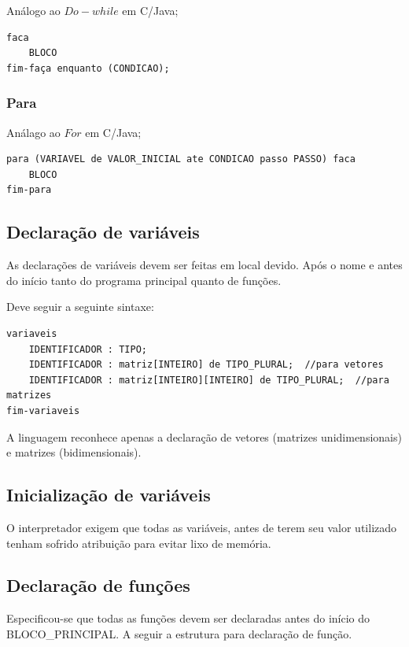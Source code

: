 \documentclass[a4paper,12pt]{report}
\begin{document}
An\'alogo ao $Do-while$ em C/Java;

\begin{verbatim}
faca
	BLOCO
fim-faça enquanto (CONDICAO);
\end{verbatim}

\subsubsection{Para}

An\'alago ao $For$ em C/Java;

\begin{verbatim}
para (VARIAVEL de VALOR_INICIAL ate CONDICAO passo PASSO) faca
	BLOCO
fim-para
\end{verbatim}

\subsection{Declara\c{c}\~ao de vari\'aveis}

As declara\c{c}\~oes de vari\'aveis devem ser feitas em local devido. Ap\'os o nome e antes do in\'icio tanto do programa principal quanto de fun\c{c}\~oes.

Deve seguir a seguinte sintaxe:

\begin{verbatim}
variaveis
	IDENTIFICADOR : TIPO;
	IDENTIFICADOR : matriz[INTEIRO] de TIPO_PLURAL;  //para vetores
    IDENTIFICADOR : matriz[INTEIRO][INTEIRO] de TIPO_PLURAL;  //para matrizes
fim-variaveis
\end{verbatim}

A linguagem reconhece apenas a declara\c{c}\~ao de vetores (matrizes unidimensionais) e matrizes (bidimensionais).

\subsection{Inicializa\c{c}\~ao de vari\'aveis}

O interpretador exigem que todas as vari\'aveis, antes de terem seu valor utilizado tenham 
sofrido atribui\c{c}\~ao para evitar lixo de mem\'oria.

\subsection{Declara\c{c}\~ao de fun\c{c}\~oes}

Especificou-se que todas as fun\c{c}\~oes devem ser declaradas antes do início do BLOCO\_PRINCIPAL.
A seguir a estrutura para declara\c{c}\~ao de fun\c{c}\~ao.
\end{document}
